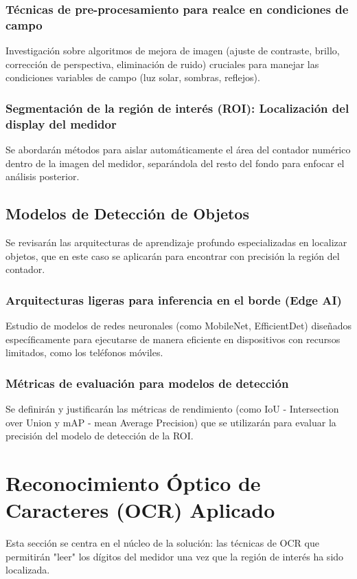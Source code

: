 \subsubsection{Técnicas de pre-procesamiento para realce en condiciones de campo}
\label{sssec:preprocesamiento}
Investigación sobre algoritmos de mejora de imagen (ajuste de contraste, brillo, corrección de perspectiva, eliminación de ruido) cruciales para manejar las condiciones variables de campo (luz solar, sombras, reflejos).

\subsubsection{Segmentación de la región de interés (ROI): Localización del display del medidor}
\label{sssec:roi}
Se abordarán métodos para aislar automáticamente el área del contador numérico dentro de la imagen del medidor, separándola del resto del fondo para enfocar el análisis posterior.

\subsection{Modelos de Detección de Objetos}
\label{ssec:deteccion_objetos}
Se revisarán las arquitecturas de aprendizaje profundo especializadas en localizar objetos, que en este caso se aplicarán para encontrar con precisión la región del contador.

\subsubsection{Arquitecturas ligeras para inferencia en el borde (Edge AI)}
\label{sssec:edge_ai}
Estudio de modelos de redes neuronales (como MobileNet, EfficientDet) diseñados específicamente para ejecutarse de manera eficiente en dispositivos con recursos limitados, como los teléfonos móviles.

\subsubsection{Métricas de evaluación para modelos de detección}
\label{sssec:metricas_deteccion}
Se definirán y justificarán las métricas de rendimiento (como IoU - Intersection over Union y mAP - mean Average Precision) que se utilizarán para evaluar la precisión del modelo de detección de la ROI.

\section{Reconocimiento Óptico de Caracteres (OCR) Aplicado}
\label{sec:ocr}
Esta sección se centra en el núcleo de la solución: las técnicas de OCR que permitirán "leer" los dígitos del medidor una vez que la región de interés ha sido localizada.

